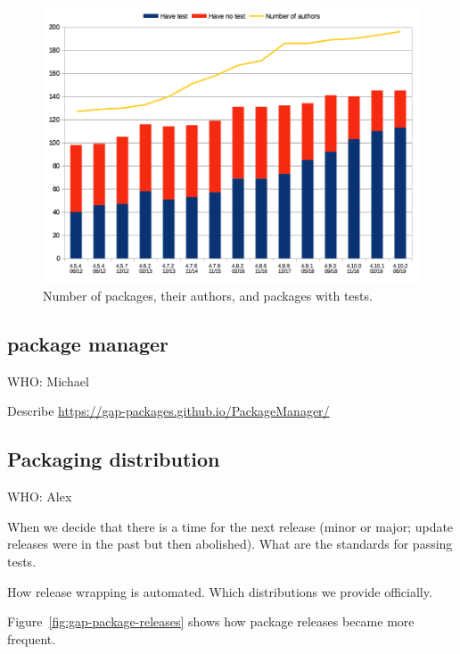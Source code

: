 \documentclass{deliverablereport}
\begin{document}
\begin{figure}[!ht]
    \centering
    \includegraphics[width=\textwidth]{images/gap-package-tests}
    \caption{Number of \GAP packages, their authors, and packages with tests.}
    \label{fig:gap-package-tests}
\end{figure}

\subsection{\GAP package manager}\label{pkg-manager}

WHO: Michael

Describe \url{https://gap-packages.github.io/PackageManager/}

\subsection{Packaging \GAP distribution}\label{distro}

WHO: Alex

When we decide that there is a time for the next release
(minor or major; update releases were in the past but then abolished).
What are the standards for passing tests. 

How release wrapping is automated.
Which \GAP distributions we provide officially.

Figure~\ref{fig:gap-package-releases} shows how package releases became more frequent.
\end{document}
